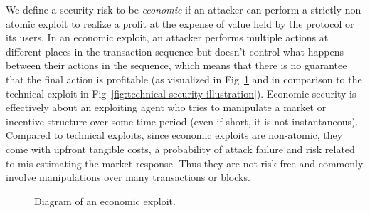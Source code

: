 We define a security risk to be \emph{economic} if an attacker can perform a strictly non-atomic exploit to realize a profit at the expense of value held by the protocol or its users.
In an economic exploit, an attacker performs multiple actions at different places in the transaction sequence but doesn't control what happens between their actions in the sequence, which means that there is no guarantee that the final action is profitable (as visualized in Fig~\ref{fig:economic-security-illustration2} and in comparison to the technical exploit in Fig~\ref{fig:technical-security-illustration}).
Economic security is effectively about an exploiting agent who tries to manipulate a market or incentive structure over some time period (even if short, it is not instantaneous). Compared to technical exploits, since economic exploits are non-atomic, they come with upfront tangible costs, a probability of attack failure and risk related to mis-estimating the market response. Thus they are not risk-free and commonly involve manipulations over many transactions or blocks.

\begin{figure}[htp]
  \centering
  \caption{Diagram of an economic exploit.}
  \label{fig:economic-security-illustration2}
\end{figure}


